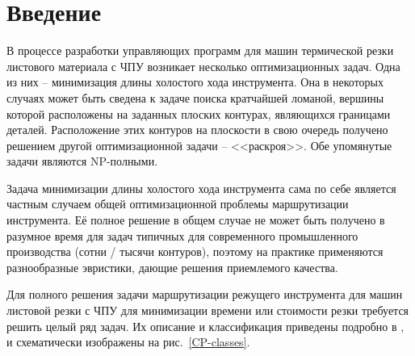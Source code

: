 \documentclass[10pt]{SPIIRAS_Proceedings}
\begin{document}
\maketitle

\normalsize

\section*{Введение}
\label{sec:intro}

В процессе разработки управляющих программ
для машин термической резки листового материала с ЧПУ
возникает несколько оптимизационных задач.
Одна из них -- минимизация
длины холостого хода инструмента.
Она в некоторых случаях может быть сведена
к задаче поиска кратчайшей ломаной,
вершины которой расположены на заданных
плоских контурах,
являющихся границами деталей.
Расположение этих контуров на плоскости
в свою очередь получено решением другой
оптимизационной задачи -- <<раскроя>>.
Обе упомянутые задачи являются NP-полными.

Задача минимизации длины холостого хода инструмента
сама по себе является частным случаем
общей оптимизационной проблемы
маршрутизации инструмента.
Её полное решение в общем случае
не может быть получено
в разумное время
для задач типичных для современного
промышленного производства
(сотни / тысячи контуров),
поэтому на практике применяются разнообразные эвристики,
дающие решения приемлемого качества.

Для полного решения задачи маршрутизации
режущего инструмента для машин листовой резки
с ЧПУ
для минимизации времени или стоимости резки
требуется решить целый ряд задач.
Их описание и классификация приведены подробно в
\cite{bi01,bi02,bi03},
и схематически изображены на рис.~\ref{CP-classes}.
\end{document}
